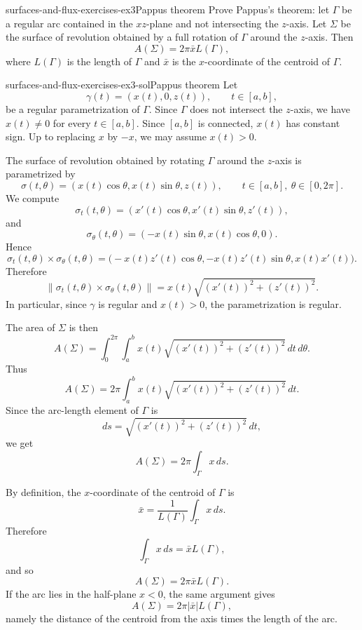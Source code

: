 \documentclass[preview]{standalone}
\begin{document}
\begin{snippetexercise}{surfaces-and-flux-exercises-ex3}{Pappus theorem}
    Prove Pappus's theorem: let \(\Gamma\) be a regular arc contained in the \(xz\)-plane and not intersecting the \(z\)-axis. Let \(\Sigma\) be the surface of revolution obtained by a full rotation of \(\Gamma\) around the \(z\)-axis. Then \[A(\Sigma)=2\pi \bar{x}L(\Gamma),\] where \(L(\Gamma)\) is the length of \(\Gamma\) and \(\bar{x}\) is the \(x\)-coordinate of the centroid of \(\Gamma\).
\end{snippetexercise}

\begin{snippetsolution}{surfaces-and-flux-exercises-ex3-sol}{Pappus theorem}
    Let
    \[
        \gamma(t)=(x(t),0,z(t)),\qquad t\in[a,b],
    \]
    be a regular parametrization of \(\Gamma\). Since \(\Gamma\) does not intersect the \(z\)-axis, we have \(x(t)\neq 0\) for every \(t\in[a,b]\). Since \([a,b]\) is connected, \(x(t)\) has constant sign. Up to replacing \(x\) by \(-x\), we may assume \(x(t)>0\).

    The surface of revolution obtained by rotating \(\Gamma\) around the \(z\)-axis is parametrized by
    \[
        \sigma(t,\theta)
        =
        (x(t)\cos\theta,x(t)\sin\theta,z(t)),
        \qquad
        t\in[a,b],\ \theta\in[0,2\pi].
    \]
    We compute
    \[
        \sigma_t(t,\theta)
        =
        (x'(t)\cos\theta,x'(t)\sin\theta,z'(t)),
    \]
    and
    \[
        \sigma_\theta(t,\theta)
        =
        (-x(t)\sin\theta,x(t)\cos\theta,0).
    \]
    Hence
    \[
        \sigma_t(t,\theta)\times\sigma_\theta(t,\theta)
        =
        \bigl(
            -x(t)z'(t)\cos\theta,
            -x(t)z'(t)\sin\theta,
            x(t)x'(t)
        \bigr).
    \]
    Therefore
    \[
        \|\sigma_t(t,\theta)\times\sigma_\theta(t,\theta)\|
        =
        x(t)\sqrt{(x'(t))^2+(z'(t))^2}.
    \]
    In particular, since \(\gamma\) is regular and \(x(t)>0\), the parametrization is regular.

    The area of \(\Sigma\) is then
    \[
        A(\Sigma)
        =
        \int_0^{2\pi}\int_a^b
        x(t)\sqrt{(x'(t))^2+(z'(t))^2}
        \,dt\,d\theta.
    \]
    Thus
    \[
        A(\Sigma)
        =
        2\pi
        \int_a^b
        x(t)\sqrt{(x'(t))^2+(z'(t))^2}
        \,dt.
    \]
    Since the arc-length element of \(\Gamma\) is
    \[
        ds=\sqrt{(x'(t))^2+(z'(t))^2}\,dt,
    \]
    we get
    \[
        A(\Sigma)
        =
        2\pi\int_\Gamma x\,ds.
    \]

    By definition, the \(x\)-coordinate of the centroid of \(\Gamma\) is
    \[
        \bar{x}
        =
        \frac{1}{L(\Gamma)}\int_\Gamma x\,ds.
    \]
    Therefore
    \[
        \int_\Gamma x\,ds=\bar{x}L(\Gamma),
    \]
    and so
    \[
        A(\Sigma)=2\pi \bar{x}L(\Gamma).
    \]
    If the arc lies in the half-plane \(x<0\), the same argument gives
    \[
        A(\Sigma)=2\pi |\bar{x}|L(\Gamma),
    \]
    namely the distance of the centroid from the axis times the length of the arc.
\end{snippetsolution}
\end{document}
